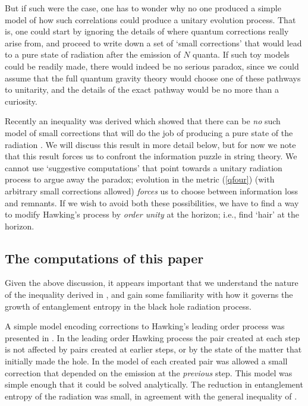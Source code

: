 \documentclass[12pt]{article}
\begin{document}
But if such were the case, one has to wonder why no one produced a simple model of how such correlations could produce a unitary evolution process. That is, one could start by ignoring the details of where quantum corrections really arise from, and proceed to write down a set of `small corrections' that would lead to a pure state of radiation after the emission of $N$ quanta. If such toy models could be readily made, there would indeed be no serious paradox, since we could assume that the full quantum gravity theory would choose one of these pathways to unitarity, and the details of the exact pathway would be no more than a curiosity. 

Recently an inequality was derived which showed that there can be {\it no} such model of small corrections that will do the job of producing a pure state of the radiation \cite{mathurfuzz}. We will discuss this result in more detail below, but for now we note that this result forces us to confront the information puzzle in string theory. We cannot use `suggestive computations' that point towards a unitary radiation process to argue away the paradox; evolution in the  metric (\ref{qfour}) (with arbitrary small corrections allowed) {\it forces} us to choose between  information loss and remnants. If we wish to avoid both these possibilities, we have to find a way to modify Hawking's process by {\it order unity} at the horizon; i.e., find `hair' at the horizon. 

\subsection{The computations of this paper}

Given the above discussion, it appears important  that we understand the nature of the inequality derived in \cite{mathurfuzz}, and gain some familiarity with how it governs the growth of entanglement entropy in the black hole radiation process. 

A simple model encoding corrections to Hawking's leading order process was presented in \cite{mathurrecent}. In the leading order Hawking process the pair created at each step is not affected by pairs created at earlier steps, or by the state of the matter that initially made the hole. In the  model of \cite{mathurrecent} each created pair was allowed a small correction that depended on the emission at the {\it previous} step. This model was simple enough that it could be solved analytically. The reduction in entanglement entropy of the radiation was small, in agreement with the general inequality of \cite{mathurfuzz}. 
\end{document}
